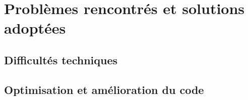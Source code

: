 \section{Problèmes rencontrés et solutions adoptées}
\subsection{Difficultés techniques}

\subsection{Optimisation et amélioration du code}
